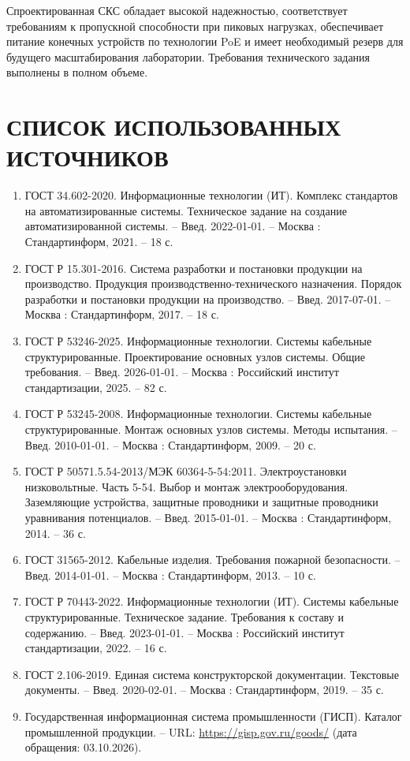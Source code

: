 \documentclass{bmstu}
\begin{document}
Спроектированная СКС обладает высокой надежностью, соответствует требованиям к пропускной способности при пиковых нагрузках, обеспечивает питание конечных устройств по технологии PoE и имеет необходимый резерв для будущего масштабирования лаборатории. Требования технического задания выполнены в полном объеме.
\cleardoublepage
{}
{}
\chapter*{СПИСОК ИСПОЛЬЗОВАННЫХ ИСТОЧНИКОВ}

\begin{enumerate}
    \item ГОСТ 34.602-2020. Информационные технологии (ИТ). Комплекс стандартов на автоматизированные системы. Техническое задание на создание автоматизированной системы. -- Введ. 2022-01-01. -- Москва : Стандартинформ, 2021. -- 18 с.
    \item ГОСТ Р 15.301-2016. Система разработки и постановки продукции на производство. Продукция производственно-технического назначения. Порядок разработки и постановки продукции на производство. -- Введ. 2017-07-01. -- Москва : Стандартинформ, 2017. -- 18 с.
    \item ГОСТ Р 53246-2025. Информационные технологии. Системы кабельные структурированные. Проектирование основных узлов системы. Общие требования. -- Введ. 2026-01-01. -- Москва : Российский институт стандартизации, 2025. -- 82 с.
    \item ГОСТ Р 53245-2008. Информационные технологии. Системы кабельные структурированные. Монтаж основных узлов системы. Методы испытания. -- Введ. 2010-01-01. -- Москва : Стандартинформ, 2009. -- 20 с.
    \item ГОСТ Р 50571.5.54-2013/МЭК 60364-5-54:2011. Электроустановки низковольтные. Часть 5-54. Выбор и монтаж электрооборудования. Заземляющие устройства, защитные проводники и защитные проводники уравнивания потенциалов. -- Введ. 2015-01-01. -- Москва : Стандартинформ, 2014. -- 36 с.
    \item ГОСТ 31565-2012. Кабельные изделия. Требования пожарной безопасности. -- Введ. 2014-01-01. -- Москва : Стандартинформ, 2013. -- 10 с.
    \item ГОСТ Р 70443-2022. Информационные технологии (ИТ). Системы кабельные структурированные. Техническое задание. Требования к составу и содержанию. -- Введ. 2023-01-01. -- Москва : Российский институт стандартизации, 2022. -- 16 с.
    \item ГОСТ 2.106-2019. Единая система конструкторской документации. Текстовые документы. -- Введ. 2020-02-01. -- Москва : Стандартинформ, 2019. -- 35 с.
    \item Государственная информационная система промышленности (ГИСП). Каталог промышленной продукции. -- URL: \url{https://gisp.gov.ru/goods/} (дата обращения: 03.10.2026).
\end{enumerate}
\end{document}
